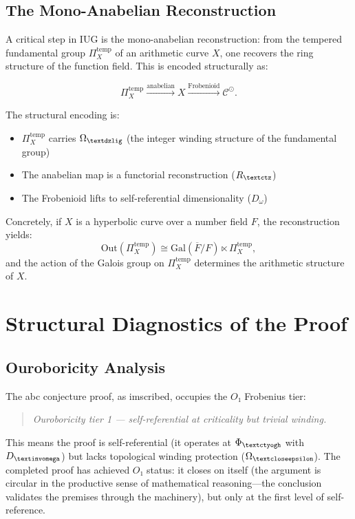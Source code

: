\documentclass[12pt]{article}
\newcommand{\invomega}{\text{\textinvomega}}
\newcommand{\closeepsilon}{\text{\textcloseepsilon}}
\newcommand{\ctyogh}{\text{\textctyogh}}
\newcommand{\ctz}{\text{\textctz}}
\newcommand{\dzlig}{\text{\textdzlig}}
\begin{document}
\subsection{The Mono-Anabelian Reconstruction}

A critical step in IUG is the mono-anabelian reconstruction: from the tempered fundamental group $\Pi_X^{\text{temp}}$ of an arithmetic curve $X$, one recovers the ring structure of the function field. This is encoded structurally as:

\begin{equation}
\Pi_X^{\text{temp}} \xrightarrow{\text{anabelian}} X \xrightarrow{\text{Frobenioid}} \mathcal{C}^\odot.
\end{equation}

The structural encoding is:
\begin{itemize}
\item $\Pi_X^{\text{temp}}$ carries $\Omega_{\dzlig}$ (the integer winding structure of the fundamental group)
\item The anabelian map is a functorial reconstruction ($R_{\ctz}$)
\item The Frobenioid lifts to self-referential dimensionality ($D_\omega$)
\end{itemize}

Concretely, if $X$ is a hyperbolic curve over a number field $F$, the reconstruction yields:
\begin{equation}
\text{Out}(\Pi_X^{\text{temp}}) \cong \text{Gal}(\overline{F}/F) \ltimes \Pi_X^{\text{temp}},
\end{equation}
and the action of the Galois group on $\Pi_X^{\text{temp}}$ determines the arithmetic structure of $X$.

\section{Structural Diagnostics of the Proof}

\subsection{Ouroboricity Analysis}

The abc conjecture proof, as imscribed, occupies the $O₁$ Frobenius tier:
\begin{quote}
\textit{Ouroboricity tier 1 --- self-referential at criticality but trivial winding.}
\end{quote}

This means the proof is self-referential (it operates at $\Phi_{\ctyogh}$ with $D_{\invomega}$) but lacks topological winding protection ($\Omega_{\closeepsilon}$). The completed proof has achieved $O₁$ status: it closes on itself (the argument is circular in the productive sense of mathematical reasoning---the conclusion validates the premises through the machinery), but only at the first level of self-reference.
\end{document}
